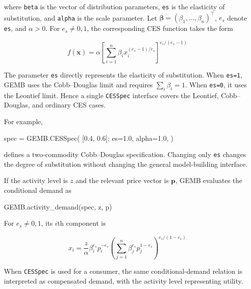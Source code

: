 \documentclass[
  letterpaper,
  DIV=11,
  numbers=noendperiod]{scrreprt}
\newenvironment{Shaded}{\begin{snugshade}}{\end{snugshade}}
\newcommand{\FloatTok}[1]{\textcolor[rgb]{0.68,0.00,0.00}{#1}}
\newcommand{\FunctionTok}[1]{\textcolor[rgb]{0.28,0.35,0.67}{#1}}
\newcommand{\NormalTok}[1]{\textcolor[rgb]{0.00,0.23,0.31}{#1}}
\newcommand{\OperatorTok}[1]{\textcolor[rgb]{0.37,0.37,0.37}{#1}}
\begin{document}
where \texttt{beta} is the vector of distribution parameters,
\texttt{es} is the elasticity of substitution, and \texttt{alpha} is the
scale parameter. Let
\(\boldsymbol{\beta}=(\beta_1,\ldots,\beta_n)^\top\), \(e_s\) denote
\texttt{es}, and \(\alpha>0\). For \(e_s\ne0,1\), the corresponding CES
function takes the form

\[
f(\mathbf x)
=
\alpha
\left[
\sum_{i=1}^n
\beta_i x_i^{(e_s-1)/e_s}
\right]^{e_s/(e_s-1)}
\]

The parameter \texttt{es} directly represents the elasticity of
substitution. When \texttt{es=1}, GEMB uses the Cobb--Douglas limit and
requires \(\sum_i\beta_i=1\). When \texttt{es=0}, it uses the Leontief
limit. Hence a single \texttt{CESSpec} interface covers the Leontief,
Cobb--Douglas, and ordinary CES cases.

For example,

\begin{Shaded}
\begin{Highlighting}[]
\NormalTok{spec }\OperatorTok{=}\NormalTok{ GEMB.}\FunctionTok{CESSpec}\NormalTok{(}
\NormalTok{    [}\FloatTok{0.4}\NormalTok{, }\FloatTok{0.6}\NormalTok{];}
\NormalTok{    es}\OperatorTok{=}\FloatTok{1.0}\NormalTok{,}
\NormalTok{    alpha}\OperatorTok{=}\FloatTok{1.0}\NormalTok{,}
\NormalTok{)}
\end{Highlighting}
\end{Shaded}

defines a two-commodity Cobb--Douglas specification. Changing only
\texttt{es} changes the degree of substitution without changing the
general model-building interface.

If the activity level is \(z\) and the relevant price vector is
\(\mathbf p\), GEMB evaluates the conditional demand as

\begin{Shaded}
\begin{Highlighting}[]
\NormalTok{GEMB.}\FunctionTok{activity\_demand}\NormalTok{(spec, z, p)}
\end{Highlighting}
\end{Shaded}

For \(e_s\ne0,1\), its \(i\)th component is

\[
x_i
=
\frac{z}{\alpha}
\beta_i^{e_s} p_i^{-e_s}
\left(
\sum_{j=1}^n
\beta_j^{e_s} p_j^{1-e_s}
\right)^{e_s/(1-e_s)}
\]

When \texttt{CESSpec} is used for a consumer, the same
conditional-demand relation is interpreted as compensated demand, with
the activity level representing utility.
\end{document}
